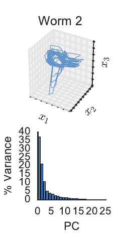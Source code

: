 \documentclass{article}
\begin{document}
\begin{figure}[t]
\begin{subfigure}[b]{.19\linewidth}
  \end{subfigure}
  \begin{subfigure}[b]{.19\linewidth}
    \includegraphics[width=\textwidth]{pca_trajectory_worm1.pdf}
  \end{subfigure}

\end{figure}
\end{document}
